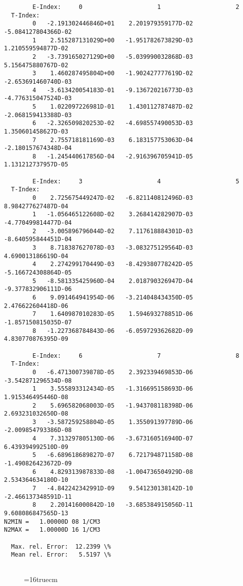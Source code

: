 \documentclass[12pt,dvipdfmx]{article}
\begin{document}
\begin{small}\begin{verbatim}
        E-Index:     0                     1                     2
  T-Index:
        0   -2.191302446846D+01    2.201979359177D-02   -5.084127804366D-02
        1    2.515287131029D+00   -1.951782673829D-03    1.210559594877D-02
        2   -3.739165027129D+00   -5.039990032868D-03    5.156475880767D-02
        3    1.460287495804D+00   -1.902427777619D-02   -2.653691460740D-03
        4   -3.613420054183D-01   -9.136720216773D-03   -4.776315047524D-03
        5    1.022097226981D-01    1.430112787487D-02   -2.068159413388D-03
        6   -2.326509820253D-02   -4.698557490053D-03    1.350601458627D-03
        7    2.755718181169D-03    6.183157753063D-04   -2.180157674348D-04
        8   -1.245440617856D-04   -2.916396705941D-05    1.131212737957D-05

        E-Index:     3                     4                     5
  T-Index:
        0    2.725675449247D-02   -6.821140812496D-03    8.984277627487D-04
        1   -1.056465122608D-02    3.268414282907D-03   -4.770499814477D-04
        2   -3.005896796044D-02    7.117618884301D-03   -8.640595844451D-04
        3    8.718387627078D-03   -3.083275129564D-03    4.690013186619D-04
        4    2.274299170449D-03   -8.429380778242D-05   -5.166724308864D-05
        5   -8.581335425960D-04    2.018790326947D-04   -9.377832906111D-06
        6    9.091464941954D-06   -3.214048434350D-05    2.476622604418D-06
        7    1.640987010283D-05    1.594693278851D-06   -1.857150815035D-07
        8   -1.227368784843D-06   -6.059729362682D-09    4.830770876395D-09

        E-Index:     6                     7                     8
  T-Index:
        0   -6.471300739878D-05    2.392339469853D-06   -3.542871296534D-08
        1    3.555893312434D-05   -1.316695158693D-06    1.915346495446D-08
        2    5.696582068003D-05   -1.943708118398D-06    2.693231032650D-08
        3   -3.587259258804D-05    1.355091397789D-06   -2.009854793386D-08
        4    7.313297805130D-06   -3.673160516940D-07    6.439394992510D-09
        5   -6.689618689827D-07    6.721794871158D-08   -1.490826423672D-09
        6    4.829313987833D-08   -1.004736504929D-08    2.534364634180D-10
        7   -4.842242342991D-09    9.541230138142D-10   -2.466137348591D-11
        8    2.201416000842D-10   -3.685384915056D-11    9.608086847565D-13
N2MIN =   1.00000D 08 1/CM3
N2MAX =   1.00000D 16 1/CM3

  Max. rel. Error:  12.2399 \%
  Mean rel. Error:   5.5197 \%


\end{verbatim}\end{small}
\begin{figure} \label{2.2.5mar}
\epsfxsize=16truecm
\end{figure}
\newpage
\end{document}
